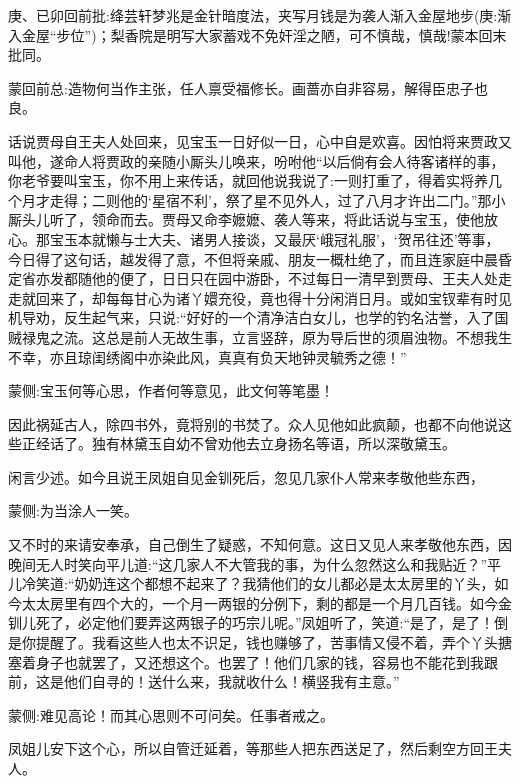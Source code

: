 
\begin{parag}
    \begin{note}庚、已卯回前批:绛芸轩梦兆是金针暗度法，夹写月钱是为袭人渐入金屋地步(庚:渐入金屋“步位”)；梨香院是明写大家蓄戏不免奸淫之陋，可不慎哉，慎哉!蒙本回末批同。\end{note}
\end{parag}


\begin{parag}
    \begin{note}蒙回前总:造物何当作主张，任人禀受福修长。画蔷亦自非容易，解得臣忠子也良。\end{note}
\end{parag}


\begin{parag}
    话说贾母自王夫人处回来，见宝玉一日好似一日，心中自是欢喜。因怕将来贾政又叫他，遂命人将贾政的亲随小厮头儿唤来，吩咐他“以后倘有会人待客诸样的事，你老爷要叫宝玉，你不用上来传话，就回他说我说了:一则打重了，得着实将养几个月才走得；二则他的‘星宿不利’，祭了星不见外人，过了八月才许出二门。”那小厮头儿听了，领命而去。贾母又命李嬷嬷、袭人等来，将此话说与宝玉，使他放心。那宝玉本就懒与士大夫、诸男人接谈，又最厌‘峨冠礼服’，‘贺吊往还’等事，今日得了这句话，越发得了意，不但将亲戚、朋友一概杜绝了，而且连家庭中晨昏定省亦发都随他的便了，日日只在园中游卧，不过每日一清早到贾母、王夫人处走走就回来了，却每每甘心为诸丫嬛充役，竟也得十分闲消日月。或如宝钗辈有时见机导劝，反生起气来，只说:“好好的一个清净洁白女儿，也学的钓名沽誉，入了国贼禄鬼之流。这总是前人无故生事，立言竖辞，原为导后世的须眉浊物。不想我生不幸，亦且琼闺绣阁中亦染此风，真真有负天地钟灵毓秀之德！”\begin{note}蒙侧:宝玉何等心思，作者何等意见，此文何等笔墨！\end{note}因此祸延古人，除四书外，竟将别的书焚了。众人见他如此疯颠，也都不向他说这些正经话了。独有林黛玉自幼不曾劝他去立身扬名等语，所以深敬黛玉。
\end{parag}


\begin{parag}
    闲言少述。如今且说王凤姐自见金钏死后，忽见几家仆人常来孝敬他些东西，\begin{note}蒙侧:为当涂人一笑。\end{note}又不时的来请安奉承，自己倒生了疑惑，不知何意。这日又见人来孝敬他东西，因晚间无人时笑向平儿道:“这几家人不大管我的事，为什么忽然这么和我贴近？”平儿冷笑道:“奶奶连这个都想不起来了？我猜他们的女儿都必是太太房里的丫头，如今太太房里有四个大的，一个月一两银的分例下，剩的都是一个月几百钱。如今金钏儿死了，必定他们要弄这两银子的巧宗儿呢。”凤姐听了，笑道:“是了，是了！倒是你提醒了。我看这些人也太不识足，钱也赚够了，苦事情又侵不着，弄个丫头搪塞着身子也就罢了，又还想这个。也罢了！他们几家的钱，容易也不能花到我跟前，这是他们自寻的！送什么来，我就收什么！横竖我有主意。”\begin{note}蒙侧:难见高论！而其心思则不可问矣。任事者戒之。\end{note}凤姐儿安下这个心，所以自管迁延着，等那些人把东西送足了，然后剩空方回王夫人。
\end{parag}


